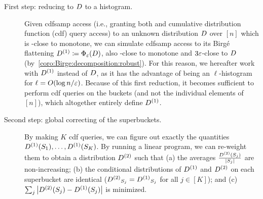 \begin{description}
  \item[First step: reducing to $\D$ to a histogram.] 
Given cdfsamp access (i.e., granting both \SAMP and cumulative distribution function (cdf) query access) to an unknown distribution $\D$ over $[n]$ which is \eps-close to monotone, we can simulate cdfsamp access to its Birg\'e flattening $\D^{(1)} \eqdef \birge[\D]{\eps}$, also \eps-close to monotone and $3\eps$-close to $\D$ (by~\cref{coro:Birge:decomposition:robust}). For this reason, we hereafter work with $\D^{(1)}$ instead of $\D$, as it has the advantage of being an $\ell$-histogram for $\ell=\bigO{{\log n}/{\eps}}$. {Because of this first reduction, it becomes sufficient to perform cdf queries on the buckets (and not the individual elements of $[n]$), which
altogether entirely define $\D^{(1)}$.}


  \item[Second step: global correcting of the superbuckets.] By making $K$ cdf queries, we can figure out exactly the quantities $\D^{(1)}(\supb_1), \dots, \D^{(1)}(\supb_K)$. By running a linear program, we can re-weight them to obtain a distribution $\D^{(2)}$ such that \textsf{(a)} the averages $\frac{\D^{(2)}(\supb_j)}{\abs{\supb_j}}$ are non-increasing; \textsf{(b)} the conditional distributions of $\D^{(1)}$ and $\D^{(2)}$ on each superbucket are identical (${\D^{(2)}}_{\supb_j} = {\D^{(1)}}_{\supb_j}$ for all $j\in[K]$); and \textsf{(c)} $\sum_j \abs{ \D^{(2)}(\supb_j) - \D^{(1)}(\supb_j)}$ is minimized.



\end{description}
